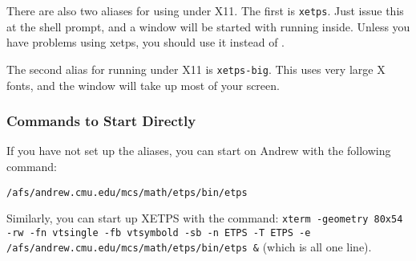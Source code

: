 \documentclass{article}
\begin{document}
There are also two aliases for using {\ETPS}
under X11.  The first is {\tt xetps}.  Just issue this at the shell prompt,
and a window will be started with {\ETPS} running inside. 
Unless you have problems using xetps, you should use it instead of {\ETPS}.

The second alias for running {\ETPS} under X11 is {\tt xetps-big}.  This uses
very large X fonts, and the window will take up most of your screen.

\begin{comment}

\subsubsection{Setting the Fontpath}

If you sourced the file /afs/andrew.cmu.edu/mcs/math/etps/etps.cshrc in your
$\sim$/.cshrc file, it will tell your X server where the fonts are.  
If you did not source it, but you wish to use XETPS or XETPS-BIG,
you should place the line\newline
\verb=/afs/andrew.cmu.edu/mcs/math/etps/etps.Xclients=\newline
in your $\sim$/.Xclients
file 
 or your $\sim$/.xinitrc file
(if you are using one), or issue that command at the shell prompt once
the window system has started up.
Alternatively, just issue the command:\newline{}
{\tt xset +fp /afs/andrew.cmu.edu/mcs/math/etps/fonts/decfonts/}\newline{}
or\newline{}
{\tt /usr/misc/bin/xset fp+ /afs/andrew.cmu.edu/mcs/math/etps/fonts/decfonts/}

\pagebreak

\end{comment}

\subsubsection{Commands to Start {\ETPS} Directly}

If you have not set up the aliases, you can start 
{\ETPS} on Andrew with the following command:

{\tt /afs/andrew.cmu.edu/mcs/math/etps/bin/etps}

Similarly, you can start up XETPS with the command:\newline
{\tt xterm -geometry 80x54 -rw -fn vtsingle -fb vtsymbold -sb -n ETPS -T ETPS -e \newline
/afs/andrew.cmu.edu/mcs/math/etps/bin/etps \&}\newline
(which is all one line).
\end{document}
